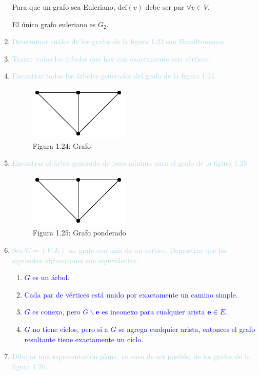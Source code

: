 \documentclass{article}
\newcommand{\lb}[1]{\textcolor{lightblue}{#1}}
\newcommand{\db}[1]{\textcolor{blue}{#1}}
\begin{document}
\begin{enumerate}[label=\color{red}\textbf{\arabic*)},leftmargin=*]
    Para que un grafo sea Euleriano, $\mathrm{def}(v)$ debe ser par $\forall v\in V$.
    
    El único grafo euleriano es $G_2$.
	\item \lb{Determinar cuáles de los grafos de la figura 1.23 son Hamiltonianos}
	\item \lb{Trazar todos los árboles que hay con exactamente seis vértices.}
	\item \lb{Encontrar todos los árboles generados del grafo de la figura 1.24.}
	
	\begin{figure}[h]
		\centering
		\includegraphics{"Imágenes/Grafos 1.24.drawio"}
		\caption*{Figura 1.24: Grafo}
	\end{figure}
	\item \lb{Encontrar el árbol generado de peso mínimo para el grafo de la figura 1.25.}
	
	\begin{figure}[h]
		\centering
		\includegraphics{"Imágenes/Grafos 1.24.drawio"}
		\caption*{Figura 1.25: Grafo ponderado}
	\end{figure}
	\item \lb{Sea $G=(V,E)$ un grafo con más de un vértice. Demostrar que las siguientes afirmaciones son equivalentes.}
	\begin{enumerate}[label=\color{red}\alph*)]
		\item \db{$G$ es un árbol.}
		\item \db{Cada par de vértices está unido por exactamente un camino simple.}
		\item \db{$G$ es conexo, pero $G\backslash\mathbf{e}$ es inconexo para cualquier arista $\mathbf{e}\in E$.}
		\item \db{$G$ no tiene ciclos, pero si a $G$ se agrega cualquier arista, entonces el grafo resultante tiene exactamente un ciclo.}
	\end{enumerate}
	\item \lb{Dibujar una representación plana, en caso de ser posible, de los grafos de la figura 1.26.}
	

\end{enumerate}
\end{document}
